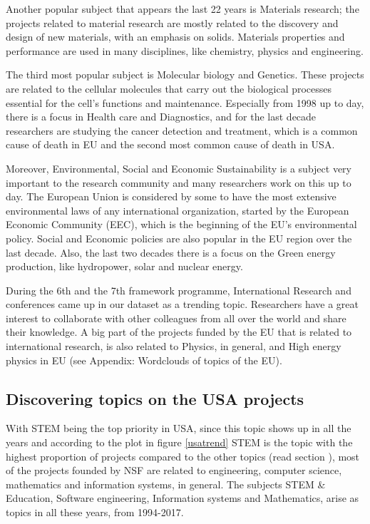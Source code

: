\documentclass[12pt]{report}
\begin{document}
Another popular subject that appears the last 22 years is Materials research;
the projects related to material research are mostly related to the discovery
and design of new materials, with an emphasis on solids. Materials properties
and performance are used in many disciplines, like chemistry, physics and
engineering.

The third most popular subject is Molecular biology and Genetics.
These projects are related to the cellular molecules that carry out
the biological processes essential for the cell's functions and
maintenance. Especially from 1998 up to day, there is a focus in
Health care and Diagnostics, and for the last decade researchers are
studying the cancer detection and treatment, which is a common cause
of death in EU and the second most common cause of death in USA.

Moreover, Environmental, Social and Economic Sustainability is a
subject very important to the research community and many researchers
work on this up to day. 
The European Union is considered by some to have the most extensive
environmental laws of any international organization, started by the
European Economic Community (EEC), which is the beginning of the EU's
environmental policy. Social and Economic policies are also popular in
the EU region over the last decade. Also, the last two decades there
is a focus on the Green energy production, like hydropower, solar and
nuclear energy.

During the 6th and the 7th framework programme, International Research and
conferences came up in our dataset as a trending topic. Researchers have a great
interest to collaborate with other colleagues from all over the world and share
their knowledge. A big part of the projects funded by the EU that is related to
international research, is also related to Physics, in general, and High energy
physics in EU (see Appendix: Wordclouds of topics of the EU).


\subsection{Discovering topics on the USA projects}


With STEM being the top priority in USA, since this topic shows up in all the years
and according to the plot in figure \ref{usatrend} STEM is the topic with the highest proportion
of projects compared to the other topics (read section ), 
most of the projects founded by
NSF are related to engineering, computer science, mathematics and
information systems, in general. The subjects STEM \& Education,
Software engineering, Information systems and Mathematics, arise as
topics in all these years, from 1994-2017.
\end{document}
